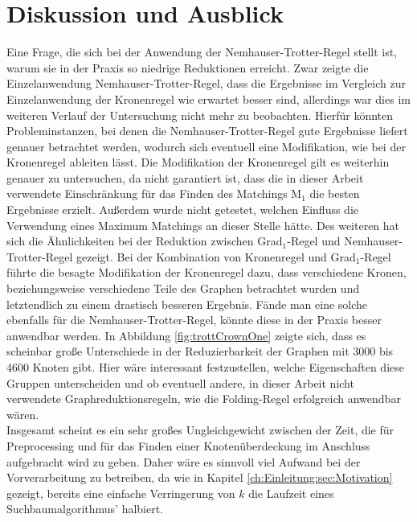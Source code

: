 
\chapter{Diskussion und Ausblick}
\label{ch:fazit}

Eine Frage, die sich bei der Anwendung der Nemhauser-Trotter-Regel stellt ist, warum sie in der Praxis so niedrige Reduktionen erreicht. Zwar zeigte die Einzelanwendung Nemhauser-Trotter-Regel, dass die Ergebnisse im Vergleich zur Einzelanwendung der Kronenregel wie erwartet besser sind, allerdings war dies im weiteren Verlauf der Untersuchung nicht mehr zu beobachten. Hierfür könnten Probleminstanzen, bei denen die Nemhauser-Trotter-Regel gute Ergebnisse liefert genauer betrachtet werden, wodurch sich eventuell eine Modifikation, wie bei der Kronenregel ableiten lässt. Die Modifikation der Kronenregel gilt es weiterhin genauer zu untersuchen, da nicht garantiert ist, dass die in dieser Arbeit verwendete Einschränkung für das Finden des Matchings M$_{1}$ die besten Ergebnisse erzielt. Außerdem wurde nicht getestet, welchen Einfluss die Verwendung eines Maximum Matchings an dieser Stelle hätte. Des weiteren hat sich die Ähnlichkeiten bei der Reduktion zwischen Grad$_{1}$-Regel und Nemhauser-Trotter-Regel gezeigt. Bei der Kombination von Kronenregel und Grad$_{1}$-Regel führte die besagte Modifikation der Kronenregel dazu, dass verschiedene Kronen, beziehungsweise verschiedene Teile des Graphen betrachtet wurden und letztendlich zu einem drastisch besseren Ergebnis. Fände man eine solche ebenfalls für die Nemhauser-Trotter-Regel, könnte diese in der Praxis besser anwendbar werden.
In Abbildung \ref{fig:trottCrownOne} zeigte sich, dass es scheinbar große Unterschiede in der Reduzierbarkeit der Graphen mit 3000 bis 4600 Knoten gibt. Hier wäre interessant festzustellen, welche Eigenschaften diese Gruppen unterscheiden und ob eventuell andere, in dieser Arbeit nicht verwendete Graphreduktionsregeln, wie die Folding-Regel erfolgreich anwendbar wären.\\
Insgesamt scheint es ein sehr großes Ungleichgewicht zwischen der Zeit, die für Preprocessing und für das Finden einer Knotenüberdeckung im Anschluss aufgebracht wird zu geben. Daher wäre es sinnvoll viel Aufwand bei der Vorverarbeitung zu betreiben, da wie in Kapitel \ref{ch:Einleitung:sec:Motivation} gezeigt, bereits eine einfache Verringerung von $k$ die Laufzeit eines Suchbaumalgorithmus' halbiert.

